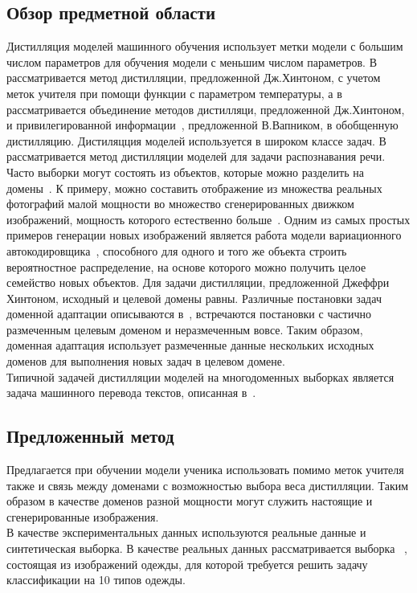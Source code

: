 \subsection{Обзор предметной области}
Дистилляция моделей машинного обучения использует метки модели с большим числом параметров для обучения модели с меньшим числом параметров. В~\cite{Hinton2015} рассматривается метод дистилляции, предложенной Дж.Хинтоном, с учетом меток учителя при помощи функции  с параметром температуры, а в~\cite{Vapnik2016} рассматривается объединение методов дистилляци, предложенной Дж.Хинтоном, и привилегированной информации~\cite{Vapnik2016}, предложенной В.Вапником, в обобщенную дистилляцию. Дистиляцция моделей используется в широком классе задач. В~\cite{MDASR} рассматривается метод дистилляции моделей для задачи распознавания речи.\\
Часто выборки могут состоять из объектов, которые можно разделить на домены~\cite{image_to_image}. К примеру, можно составить отображение из множества реальных фотографий малой мощности во множество сгенерированных движком изображений, мощность которого естественно больше~\cite{DA}. Одним из самых простых примеров генерации новых изображений является работа модели вариационного автокодировщика~\cite{VAE}, способного для одного и того же объекта строить вероятностное распределение, на основе которого можно получить целое семейство новых объектов. Для задачи дистилляции, предложенной Джеффри Хинтоном, исходный и целевой домены равны. Различные постановки задач доменной адаптации описываются в~\cite{DeepvisDA}, встречаются постановки с частично размеченным целевым доменом и неразмеченным вовсе. Таким образом, доменная адаптация использует размеченные данные нескольких исходных доменов для выполнения новых задач в целевом домене.\\
Типичной задачей дистилляции моделей на многодоменных выборках является задача машинного перевода текстов, описанная в~\cite{KimRush2016}.\\
\subsection{Предложенный метод}
Предлагается при обучении модели ученика использовать помимо меток учителя также и связь между доменами с возможностью выбора веса дистилляции. Таким образом в качестве доменов разной мощности могут служить настоящие и сгенерированные изображения.\\
В качестве экспериментальных данных используются реальные данные и синтетическая выборка. В качестве реальных данных рассматривается выборка ~\cite{FMNIST}, состоящая из изображений одежды, для которой требуется решить задачу классификации на 10 типов одежды.\\

